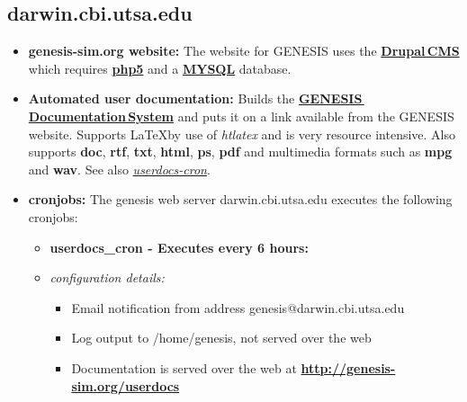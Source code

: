 \documentclass[12pt]{article}
\begin{document}
\subsection*{\bf darwin.cbi.utsa.edu}

\begin{itemize}

\item {\bf genesis-sim.org website:} The website for GENESIS uses the \href{http://drupal.org/}{\bf Drupal\,CMS} which requires \href{http://www.php.net/}{\bf php5} and a \href{http://www.mysql.com/}{\bf MYSQL} database.

\item {\bf Automated user documentation:} Builds the \href{../documentation-overview/documentation-overview.tex}{\bf GENESIS\,Documentation\,System} and puts it on a link available from the GENESIS website.  Supports \LaTeX by use of {\it htlatex} and is very resource intensive.  Also supports {\bf doc}, {\bf rtf}, {\bf txt}, {\bf html}, {\bf ps}, {\bf pdf} and multimedia formats such as {\bf mpg} and {\bf wav}.  See also \href{../userdocs-cron/userdocs-cron.tex}{\it userdocs-cron}.


\item {\bf cronjobs:} The genesis web server darwin.cbi.utsa.edu executes the following cronjobs:
\begin{itemize}
	\item {\bf userdocs\_cron - Executes every 6 hours:}
	\item {\it configuration details:} 
	\begin{itemize} 
	\item Email notification from address genesis@darwin.cbi.utsa.edu
	\item Log output to /home/genesis, not served over the web
	\item Documentation is served over the web at \href{http://genesis-sim.org/userdocs}{\bf http://genesis-sim.org/userdocs}
	\end{itemize}
\end{itemize}
\end{itemize}
\end{document}
